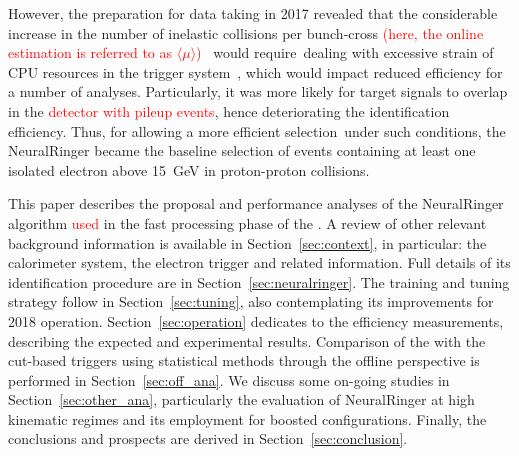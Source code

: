 However, the preparation for data taking in 2017 revealed that the considerable increase in the number of inelastic collisions per bunch-cross \textcolor{red}{(here, the online estimation is referred to as $\langle \mu \rangle$)}~\cite{DAPR-2013-01} would require dealing with excessive strain of CPU resources in the trigger system~\cite{ATL-DAQ-PUB-2018-002}, which would impact reduced efficiency for a number of analyses. Particularly, it was more likely for target  signals to overlap in the \textcolor{red}{detector with pileup events}, hence deteriorating the identification efficiency. Thus, for allowing a more efficient selection under such conditions, the NeuralRinger became the baseline selection of events containing at least one isolated electron above \SI{15}{\GeV} in proton-proton collisions.




This paper describes the proposal and performance analyses of the NeuralRinger
algorithm \textcolor{red}{used} in the fast processing phase of the \hlt{}. A review
of other relevant background information is available in
Section~\ref{sec:context}, in particular: the calorimeter system, the electron
trigger and related information. Full details of its identification procedure are
in Section~\ref{sec:neuralringer}. The training and tuning strategy follow in
Section~\ref{sec:tuning}, also contemplating its improvements for 2018
operation. Section~\ref{sec:operation} dedicates to the efficiency measurements,
describing the expected and experimental results. Comparison of the \rnn with
the cut-based triggers using statistical methods through the offline perspective
is performed in Section~\ref{sec:off_ana}. We discuss some on-going studies in
Section~\ref{sec:other_ana}, particularly the evaluation of NeuralRinger at high
kinematic regimes and its employment for boosted configurations. Finally,
the conclusions and prospects are derived in Section~\ref{sec:conclusion}.


